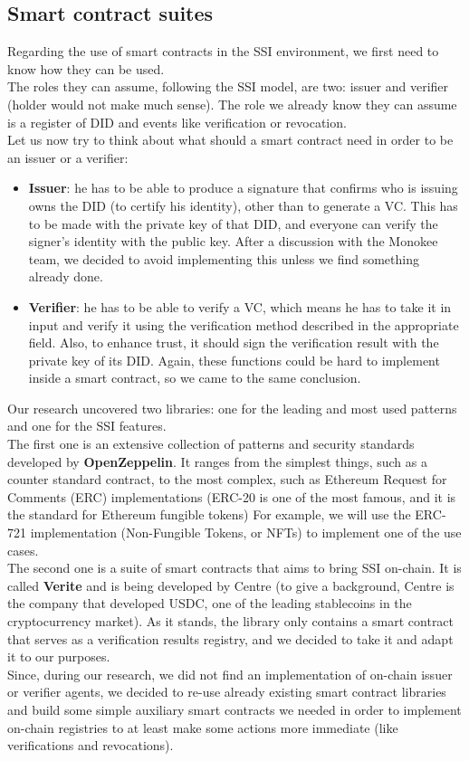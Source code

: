 \subsection{Smart contract suites}
Regarding the use of smart contracts in the SSI environment, we first need to know how they 
can be used.\\
The roles they can assume, following the SSI model, are two: issuer and verifier (holder 
would not make much sense). The role we already know they can assume is a register of DID 
and events like verification or revocation.
\vspace{0.3cm}\\
Let us now try to think about what should a smart contract need in order to be an issuer or 
a verifier:
\begin{itemize}
    \item \textbf{Issuer}: he has to be able to produce a signature that confirms who is 
    issuing owns the DID (to certify his identity), other than to generate a VC.
    This has to be made with the private key of that DID, and everyone can verify the signer's 
    identity with the public key. After a discussion with the Monokee team, we decided to 
    avoid implementing this unless we find something already done.
    \item \textbf{Verifier}: he has to be able to verify a VC, which means he has to take it 
    in input and verify it using the verification method described in the appropriate field. 
    Also, to enhance trust, it should sign the verification result with the private key of 
    its DID. Again, these functions could be hard to implement inside a smart contract, so we 
    came to the same conclusion.
\end{itemize}
Our research uncovered two libraries: one for the leading and most used patterns and one 
for the SSI features.\\
The first one is an extensive collection of patterns and security standards developed by 
\textbf{OpenZeppelin}. It ranges from the simplest things, such as a counter standard contract, to 
the most complex, such as Ethereum Request for Comments (ERC) implementations (ERC-20 is 
one of the most famous, and it is the standard for Ethereum fungible tokens)
For example, we will use the ERC-721 implementation (Non-Fungible Tokens, or NFTs) to 
implement one of the use cases.\\
The second one is a suite of smart contracts that aims to bring SSI on-chain. It is called 
\textbf{Verite} and is being developed by Centre (to give a background, Centre is the company
that developed USDC, one of the leading stablecoins in the cryptocurrency market).
As it stands, the library only contains a smart contract that serves as a verification 
results registry, and we decided to take it and adapt it to our purposes.
\vspace{0.3cm}\\
Since, during our research, we did not find an implementation of on-chain issuer or verifier 
agents, we decided to re-use already existing smart contract libraries and build some simple
auxiliary smart contracts we needed in order to implement on-chain registries to at least 
make some actions more immediate (like verifications and revocations).
